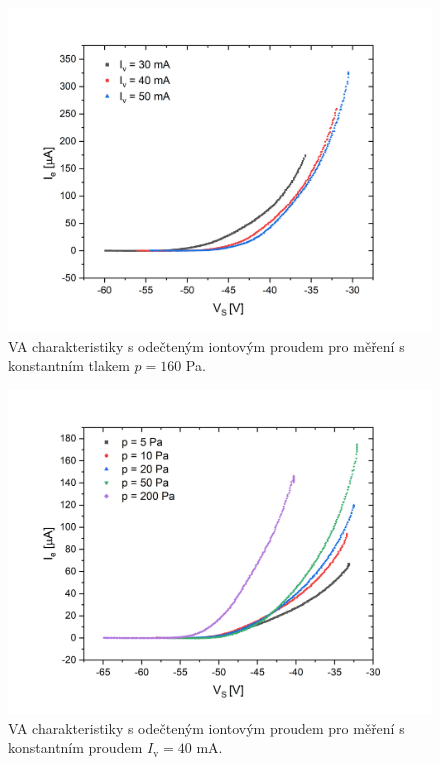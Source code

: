 \documentclass[a4paper,12pt]{article}
\begin{document}
\newpage
\begin{figure}[h!]
	\centering
	\includegraphics[width=135mm]{odectene012.png}
	\caption{VA charakteristiky s odečteným iontovým proudem pro měření s konstantním tlakem $p = 160$ \si{\pascal}.}
	\label{odectene012}
\end{figure}

\begin{figure}[h!]
	\centering
	\includegraphics[width=135mm]{odectene34567.png}
	\caption{VA charakteristiky s odečteným iontovým proudem pro měření s konstantním proudem $I_\text{v} = 40$ \si{\milli\ampere}.}
	\label{odectene34567}
\end{figure}
\end{document}
